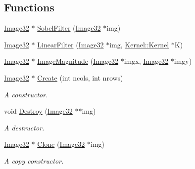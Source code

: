 \subsection*{Functions}
\begin{DoxyCompactItemize}
\item 
\hyperlink{namespacegft_1_1Image32_a6c5a03566b593bb406f1fe33266a0382}{Image32} $\ast$ \hyperlink{namespacegft_1_1Image32_aa1dc6b37e4b078f6a7957e1f4599fec6}{Sobel\-Filter} (\hyperlink{namespacegft_1_1Image32_a6c5a03566b593bb406f1fe33266a0382}{Image32} $\ast$img)
\item 
\hyperlink{namespacegft_1_1Image32_a6c5a03566b593bb406f1fe33266a0382}{Image32} $\ast$ \hyperlink{namespacegft_1_1Image32_a2d12581cb7829426c3a3401c0a45e7ef}{Linear\-Filter} (\hyperlink{namespacegft_1_1Image32_a6c5a03566b593bb406f1fe33266a0382}{Image32} $\ast$img, \hyperlink{namespacegft_1_1Kernel_a88f2f8f5778d1d17a52a77e1f2518ab3}{Kernel\-::\-Kernel} $\ast$K)
\item 
\hyperlink{namespacegft_1_1Image32_a6c5a03566b593bb406f1fe33266a0382}{Image32} $\ast$ \hyperlink{namespacegft_1_1Image32_a673f7fb9c237e0897132e35fd02d00d7}{Image\-Magnitude} (\hyperlink{namespacegft_1_1Image32_a6c5a03566b593bb406f1fe33266a0382}{Image32} $\ast$imgx, \hyperlink{namespacegft_1_1Image32_a6c5a03566b593bb406f1fe33266a0382}{Image32} $\ast$imgy)
\item 
\hyperlink{namespacegft_1_1Image32_a6c5a03566b593bb406f1fe33266a0382}{Image32} $\ast$ \hyperlink{namespacegft_1_1Image32_aafef8dafc4fe11b3ad9384bc88f9282d}{Create} (int ncols, int nrows)
\begin{DoxyCompactList}\small\item\em A constructor. \end{DoxyCompactList}\item 
void \hyperlink{namespacegft_1_1Image32_a8af9ff5a2bd012ec196a0c1a2ee70d8c}{Destroy} (\hyperlink{namespacegft_1_1Image32_a6c5a03566b593bb406f1fe33266a0382}{Image32} $\ast$$\ast$img)
\begin{DoxyCompactList}\small\item\em A destructor. \end{DoxyCompactList}\item 
\hyperlink{namespacegft_1_1Image32_a6c5a03566b593bb406f1fe33266a0382}{Image32} $\ast$ \hyperlink{namespacegft_1_1Image32_a39385351619f9249e1178a86bdc7d641}{Clone} (\hyperlink{namespacegft_1_1Image32_a6c5a03566b593bb406f1fe33266a0382}{Image32} $\ast$img)
\begin{DoxyCompactList}\small\item\em A copy constructor. \end{DoxyCompactList}\item 
$$
\end{DoxyCompactItemize}

